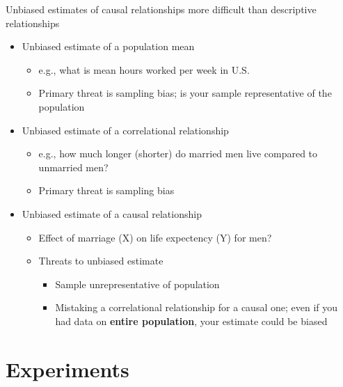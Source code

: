 \begin{frame}{Unbiased estimates of causal relationships more difficult than descriptive relationships}
	\begin{itemize}
		\item Unbiased estimate of a population mean
		\begin{itemize}
			\item  e.g., what is mean hours worked per week in U.S.
			\item Primary threat is sampling bias; is your sample representative of the population
		\end{itemize}
		\item Unbiased estimate of a correlational relationship
		\begin{itemize}
			\item e.g., how much longer (shorter) do married men live compared to unmarried men?
			\item Primary threat is sampling bias		
		\end{itemize}
		\item Unbiased estimate of a causal relationship
		\begin{itemize}
			\item Effect of marriage (X) on life expectency (Y) for men?
			\item Threats to unbiased estimate
			\begin{itemize}
				\item Sample unrepresentative of population
				\item Mistaking a correlational relationship for a causal one; even if you had data on \textbf{entire population}, your estimate could be biased 
			\end{itemize}
		\end{itemize}
	\end{itemize}
\end{frame}


\section[Experiments]{Experiments}

